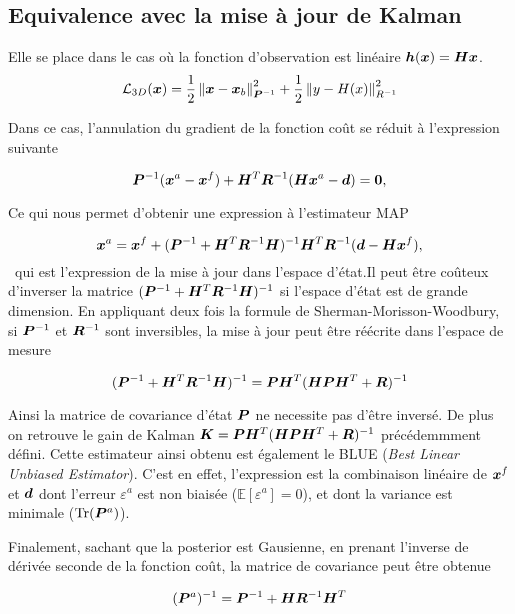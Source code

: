 \subsection{Equivalence avec la mise à jour de Kalman}

Elle se place dans le cas où la fonction d'observation est linéaire $\bm h(\bm{x}) = \bm{H} \bm{x}$.
$$\mathcal L_{3D}(\bm{x}) = \frac{1}{2}\left\lVert \bm{x}-\bm{x}_b \right\rVert_{\bm{P}^{-1}}^2+ \frac{1}{2}\left\lVert y-H(x) \right\rVert^2_{R^{-1}}$$

Dans ce cas, l'annulation du gradient de la fonction coût se réduit à l'expression suivante

\begin{equation*}
    \bm{P}^{-1} (\bm{x}^a - \bm{x}^f) + \bm{H}^T \bm{R}^{-1}(\bm{H} \bm{x}^a - \bm d) = \bm 0,
\end{equation*}

Ce qui nous permet d'obtenir une expression à l'estimateur MAP

\begin{equation*}
    \bm{x}^a = \bm{x}^f + (\bm{P}^{-1} + \bm{H}^T \bm{R}^{-1} \bm{H})^{-1} \bm{H}^T \bm{R}^{-1} (\bm{d} - \bm{H} \bm{x}^f),
\end{equation*}~qui est l'expression de la mise à jour dans l'espace d'état.Il peut être coûteux d'inverser la matrice $(\bm{P}^{-1} + \bm{H}^T \bm{R}^{-1} \bm{H})^{-1}$ si l'espace d'état est de grande dimension. En appliquant deux fois la formule de Sherman-Morisson-Woodbury, si $\bm{P}^{-1}$ et $\bm{R}^{-1}$ sont inversibles, la mise à jour peut être réécrite dans l'espace de mesure

\begin{equation*}
    (\bm{P}^{-1} + \bm{H}^T \bm{R}^{-1} \bm{H})^{-1} = \bm{P} \bm{H}^T (\bm{H} \bm{P} \bm{H}^T + \bm{R})^{-1}
\end{equation*}

Ainsi la matrice de covariance d'état $\bm{P}$ ne necessite pas d'être inversé. De plus on retrouve le gain de Kalman $\bm{K} = \bm{P} \bm{H}^T (\bm{H} \bm{P} \bm{H}^T + \bm{R})^{-1}$ précédemmment défini. Cette estimateur ainsi obtenu est également le BLUE (\textit{Best Linear Unbiased Estimator}). C'est en effet, l'expression est la combinaison linéaire de $\bm{x}^f$ et $\bm{d}$ dont l'erreur $\varepsilon^a$ est non biaisée ($\mathbb{E}[\varepsilon^a] = 0$), et dont la variance est minimale ($\operatorname{Tr}(\bm{P}^a)$).

Finalement, sachant que la posterior est Gausienne, en prenant l'inverse de dérivée seconde de la fonction coût, la matrice de covariance peut être obtenue

\begin{equation*}
    (\bm{P}^a)^{-1} = \bm{P}^{-1} + \bm{H} \bm{R}^{-1} \bm{H}^T
\end{equation*}

